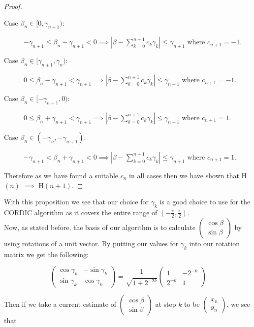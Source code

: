 {\begin{proof}
\begin{description}
\begin{description}
	\item[Case \(\beta_n \in [0, \gamma_{n+1})\):]\hfill\break
		\(-\gamma_{n+1} \le \beta_n - \gamma_{n+1} < 0 \implies |\beta - \sum_{k=0}^{n+1}c_k\gamma_k| \le \gamma_{n+1}\) where \(c_{n+1} = -1\).
	\item[Case \(\beta_n \in [\gamma_{n+1}, \gamma_n)\):]\hfill\break
		\(0 \le \beta_n - \gamma_{n+1} < \gamma_{n+1} \implies |\beta - \sum_{k=0}^{n+1}c_k\gamma_k| \le \gamma_{n+1}\) where \(c_{n+1} = -1\).
	\item[Case \(\beta_n \in [-\gamma_{n+1}, 0)\):]\hfill\break
		\(0 \le \beta_n + \gamma_{n+1} < \gamma_{n+1} \implies |\beta - \sum_{k=0}^{n+1}c_k\gamma_k| \le \gamma_{n+1}\) where \(c_{n+1} = 1\).
	\item[Case \(\beta_n \in (-\gamma_n, -\gamma_{n+1})\):]\hfill\break
		\(-\gamma_{n+1} < \beta_n + \gamma_{n+1} < 0 \implies |\beta - \sum_{k=0}^{n+1}c_k\gamma_k| \le \gamma_{n+1}\) where \(c_{n+1} = 1\).
	\end{description}
\end{description}
	Therefore as we have found a suitable \(c_n\) in all cases then we have shown that \textrm{H\((n)\) \(\implies\) H\((n+1)\)}.
\end{proof}

With this proposition we see that our choice for \(\gamma_k\) is a good choice to use for the CORDIC algorithm as it covers the entire range of \((-\frac{\pi}{2}, \frac{\pi}{2})\).\\

Now, as stated before, the basis of our algorithm is to calculate \(\left(\begin{array}{c}\cos\beta\\\sin\beta\end{array}\right)\) by using rotations of a unit vector. By putting our values for \(\gamma_k\) into our rotation matrix we get the following:

\begin{displaymath}
\left(\begin{array}{cc}
	\cos\gamma_k & -\sin\gamma_k\\
	\sin\gamma_k & \cos\gamma_k
	\end{array}\right)
= \frac{1}{\sqrt{1 + 2^{-2k}}}
\left(\begin{array}{cc}
	1 & -2^{-k}\\
	2^{-k} & 1
\end{array}\right)
\end{displaymath}

Then if we take a current estimate of \(\left(\begin{array}{c}\cos\beta\\\sin\beta\end{array}\right)\) at step \(k\) to be \(\left(\begin{array}{c}x_n\\y_n\end{array}\right)\), we see that

}

